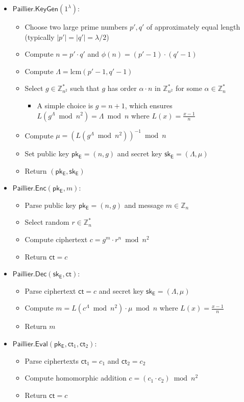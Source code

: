 \begin{itemize}
\item $\mathsf{Paillier.KeyGen}(1^\lambda)$:
   \begin{itemize}
       \item Choose two large prime numbers $p', q'$ of approximately equal length (typically $|p'| = |q'| = \lambda/2$)
       \item Compute $n = p' \cdot q'$ and $\phi(n) = (p'-1) \cdot (q'-1)$
       \item Compute $\Lambda = \text{lcm}(p'-1, q'-1)$
       \item Select $g \in \mathbb{Z}_{n^2}^*$ such that $g$ has order $\alpha \cdot n$ in $\mathbb{Z}_{n^2}^*$ for some $\alpha \in \mathbb{Z}_n^*$
       \begin{itemize}
           \item A simple choice is $g = n + 1$, which ensures $L(g^\Lambda \bmod n^2) = \Lambda \bmod n$ where $L(x) = \frac{x-1}{n}$
       \end{itemize}
       \item Compute $\mu = (L(g^\Lambda \bmod n^2))^{-1} \bmod n$
       \item Set public key $\mathsf{pk_E} = (n, g)$ and secret key $\mathsf{sk_E} = (\Lambda, \mu)$
       \item Return $(\mathsf{pk_E}, \mathsf{sk_E})$
   \end{itemize}

\item $\mathsf{Paillier.Enc}(\mathsf{pk_E}, m)$:
   \begin{itemize}
       \item Parse public key $\mathsf{pk_E} = (n, g)$ and message $m \in \mathbb{Z}_n$
       \item Select random $r \in \mathbb{Z}_n^*$
       \item Compute ciphertext $c = g^m \cdot r^n \bmod n^2$
       \item Return $\mathsf{ct} = c$
   \end{itemize}
   
\item $\mathsf{Paillier.Dec}(\mathsf{sk_E}, \mathsf{ct})$:
   \begin{itemize}
       \item Parse ciphertext $\mathsf{ct} = c$ and secret key $\mathsf{sk_E} = (\Lambda, \mu)$
       \item Compute $m = L(c^\Lambda \bmod n^2) \cdot \mu \bmod n$ where $L(x) = \frac{x-1}{n}$
       \item Return $m$
   \end{itemize}
   
\item $\mathsf{Paillier.Eval}(\mathsf{pk_E}, \mathsf{ct}_1, \mathsf{ct}_2)$:
   \begin{itemize}
       \item Parse ciphertexts $\mathsf{ct}_1 = c_1$ and $\mathsf{ct}_2 = c_2$
       \item Compute homomorphic addition $c = (c_1 \cdot c_2) \bmod n^2$
       \item Return $\mathsf{ct} = c$
   \end{itemize}
\end{itemize}

